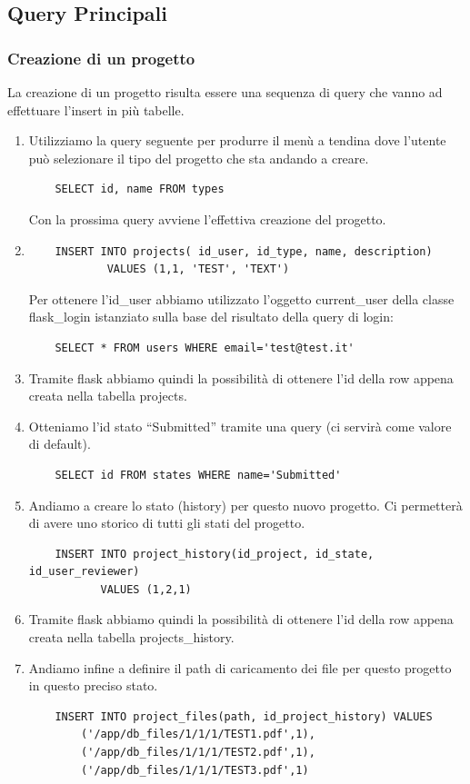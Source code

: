 \documentclass{article}
\begin{document}
\subsection{Query Principali}
\subsubsection{Creazione di un progetto}
La creazione di un progetto risulta essere una sequenza di query che vanno ad  effettuare l'insert in più tabelle.\\
\begin{enumerate}
    \item Utilizziamo la query seguente per produrre il menù a tendina dove l'utente può selezionare il tipo del progetto che sta andando a creare.
    \begin{lstlisting}
    SELECT id, name FROM types
    \end{lstlisting}
    Con la prossima query avviene l'effettiva creazione del progetto.
    \item 
    \begin{lstlisting}
    INSERT INTO projects( id_user, id_type, name, description) 
            VALUES (1,1, 'TEST', 'TEXT')
    \end{lstlisting}
    Per ottenere l'id\_user abbiamo utilizzato l'oggetto current\_user della classe flask\_login istanziato sulla base del risultato della query di login:
    \begin{lstlisting}
    SELECT * FROM users WHERE email='test@test.it'
    \end{lstlisting}
    \item Tramite flask abbiamo quindi la possibilità di ottenere l'id della row appena creata nella tabella projects.
    \item Otteniamo l'id stato “Submitted” tramite una query (ci servirà come valore di default).
    \begin{lstlisting}
    SELECT id FROM states WHERE name='Submitted'
    \end{lstlisting}
    \item Andiamo a creare lo stato (history) per questo nuovo progetto. Ci permetterà di avere uno storico di tutti gli stati del progetto.
    \begin{lstlisting}
    INSERT INTO project_history(id_project, id_state, id_user_reviewer) 
           VALUES (1,2,1)
    \end{lstlisting}
    \item Tramite flask abbiamo quindi la possibilità di ottenere l'id della row appena creata nella tabella projects\_history.
    \item Andiamo infine a definire il path di caricamento dei file per questo progetto in questo preciso stato.
    \begin{lstlisting}
    INSERT INTO project_files(path, id_project_history) VALUES 
        ('/app/db_files/1/1/1/TEST1.pdf',1),
        ('/app/db_files/1/1/1/TEST2.pdf',1),
        ('/app/db_files/1/1/1/TEST3.pdf',1)
    \end{lstlisting}
\end{enumerate}
\end{document}

